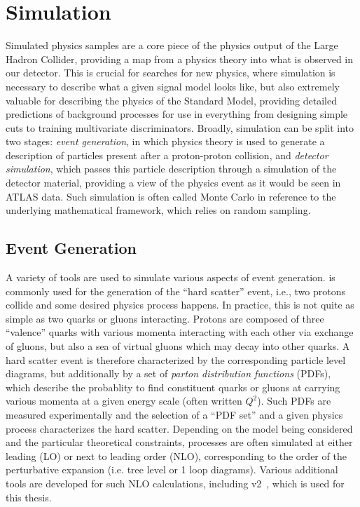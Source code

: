 \chapter{Simulation}
\label{chap:simulation}

Simulated physics samples are a core piece of the physics output of the Large Hadron Collider, 
providing a map from a physics theory into what is observed in our detector. This is crucial for 
searches for new physics, where simulation is necessary to describe what a given signal model looks 
like, but also extremely valuable for describing the physics of the Standard Model, providing detailed 
predictions of background processes for use in everything from designing simple cuts to training 
multivariate discriminators. Broadly, simulation can be split into two stages: \emph{event generation}, in which 
physics theory is used to generate a description of particles present after a proton-proton collision, and 
\emph{detector simulation}, which passes this particle description through a simulation of the detector 
material, providing a view of the physics event as it would be seen in ATLAS data. Such simulation 
is often called Monte Carlo in reference to the underlying mathematical framework, which relies on random 
sampling. 

\section{Event Generation}
A variety of tools are used to simulate various aspects of event generation. \MADGRAPH\cite{MG5} 
is commonly used for the generation of the ``hard scatter'' event, i.e., two protons collide and 
some desired physics process happens. In practice, this is not quite as simple as two quarks or 
gluons interacting. Protons are composed of three ``valence'' quarks with various momenta interacting 
with each other via exchange of gluons, but also a sea of virtual gluons which may decay into other
quarks. A hard scatter event is therefore characterized by the corresponding particle level 
diagrams, but additionally by a set of \emph{parton distribution functions} (PDFs), which describe the 
probablity to find constituent quarks or gluons at carrying various momenta at a given energy 
scale (often written $Q^2$). Such PDFs are measured experimentally  and the selection 
of a ``PDF set'' and a given physics process characterizes the hard scatter. Depending on the model being 
considered and the particular theoretical constraints, processes are often simulated at either leading (LO) 
or next to leading order (NLO), corresponding to the order of the perturbative expansion (i.e. tree level 
or 1 loop diagrams). Various additional tools are developed for such NLO calculations, 
including \POWHEGBOX v2~\cite{Powheg1, Powheg2, Powheg3}, which is used for this thesis.

